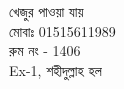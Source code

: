 \documentclass{article}
\begin{document}
\centering
{}
{{\fontsize{110}{132} \selectfont খেজুর পাওয়া যায়\\}{\fontsize{80}{96}\selectfont মোবাঃ 01515611989\\  রুম নং -  1406\\ Ex-1, শহীদুল্লাহ হল\\}\vspace{1cm}}
\end{document}

